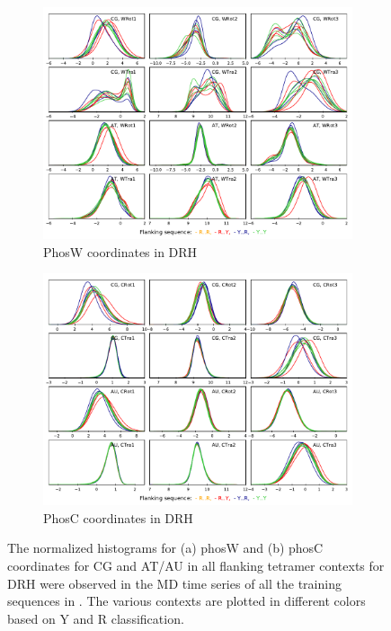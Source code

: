 \begin{figure}[H]
  \begin{subfigure}{15cm}
    \centering\includegraphics[width=15cm]{images/HDR_phosW_CG_AU.pdf}
    \caption{PhosW coordinates in DRH}
  \end{subfigure}
  \begin{subfigure}{15cm}
    \centering\includegraphics[width=15cm,trim=0cm 0cm 0cm 0.6cm]{images/HDR_phosC_CG_AU.pdf}
    \caption{PhosC coordinates in DRH}
  \end{subfigure}
\caption{
The normalized histograms for (a) phosW and (b) phosC coordinates for CG and AT/AU in all flanking tetramer contexts for DRH were observed in the MD time series of all the training sequences in \Lbdrh. The various contexts are plotted in different colors based on Y and R classification. 
}
\label{c3:fig_distr_5}
\end{figure} 

